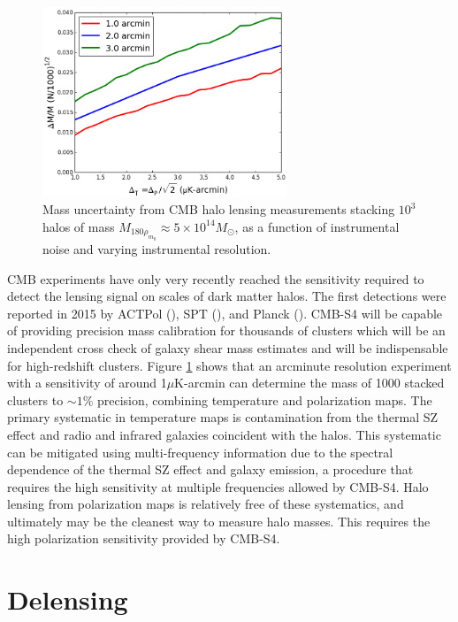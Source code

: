 \begin{figure}[htbp]
\centering 
\includegraphics[width=0.65\textwidth]{CMBLensing/HaloLens.png}
\caption{Mass uncertainty from CMB halo lensing measurements stacking $10^3$ halos of mass $M_{180\rho_{m_0}} \approx 5\times 10^{14} M_{\odot}$, as a function of instrumental noise and varying instrumental resolution.}
\label{haloLens}
\end{figure}

CMB experiments have only very recently reached the sensitivity required to detect the lensing signal on scales of dark matter halos.  The first detections were reported in 2015 by ACTPol (\cite{Madhavacheril:2014slf}), SPT (\cite{Baxter:2014frs}), and Planck (\cite{Ade:2015fva}).  CMB-S4 will be capable of providing precision mass calibration for thousands of clusters which will be an independent cross check of galaxy shear mass estimates and will be indispensable for high-redshift clusters. Figure \ref{haloLens} shows that an arcminute resolution experiment with a sensitivity of around 1$\mu$K-arcmin can determine the mass of 1000 stacked clusters to $\sim 1\%$ precision, combining temperature and polarization maps. The primary systematic in temperature maps is contamination from the thermal SZ effect and radio and infrared galaxies coincident with the halos. This systematic can be mitigated using multi-frequency information due to the spectral dependence of the thermal SZ effect and galaxy emission, a procedure that requires the high sensitivity at multiple frequencies allowed by CMB-S4.  Halo lensing from polarization maps is relatively free of these systematics, and ultimately may be the cleanest way to measure halo masses.  This requires the high polarization sensitivity provided by CMB-S4. 


\section{Delensing}\label{delens}

